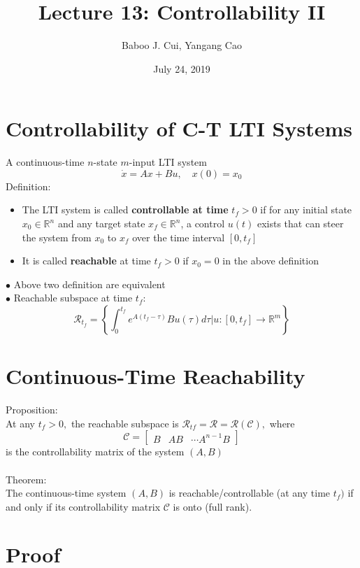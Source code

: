 \documentclass[10pt,a4paper,oneside]{article}
\date{July 24, 2019}
\author{Baboo J. Cui, Yangang Cao}
\title{Lecture 13: Controllability II}
\begin{document}
\maketitle
\tableofcontents
\newpage
\section{Controllability of C-T LTI Systems}
A continuous-time $n$-state $m$-input LTI system
\begin{equation}
\dot{x}=A x+B u, \quad x(0)=x_{0}
\end{equation}
Definition:
\begin{itemize}
\item The LTI system is called {\bfseries controllable at time} $t_f>0$ if for any initial state $x_0\in\mathbb{R}^n$ and any target state $x_f\in\mathbb{R}^n$, a control $u(t)$ exists that can steer the system from $x_0$ to $x_f$ over the time interval $[0, t_f]$
\item It is called {\bfseries reachable} at time $t_f>0$ if $x_0=0$ in the above definition
\end{itemize}
$\bullet$ Above two definition are equivalent\\
$\bullet$ Reachable subspace at time $t_f$:
\[
\mathcal{R}_{t_{f}}=\left\{\int_{0}^{t_{f}} e^{A\left(t_{f}-\tau\right)} B u(\tau) d \tau | u :\left[0, t_{f}\right] \rightarrow \mathbb{R}^{m}\right\}
\]
\section{Continuous-Time Reachability}
Proposition:\\
At any $t_{f}>0,$ the reachable subspace is $\mathcal{R}_{t f}=\mathcal{R}=\mathcal{R}(\mathcal{C}),$ where
\[
\mathcal{C}=\left[\begin{array}{lll}{B} & {A B} & {\cdots A^{n-1} B}\end{array}\right]
\]
is the controllability matrix of the system $(A, B)$\\
\\
Theorem:\\
The continuous-time system $(A, B)$ is reachable/controllable (at any time
$t_{f} )$ if and only if its controllability matrix $\mathcal{C}$ is onto (full rank).
\section{Proof}
\end{document}
